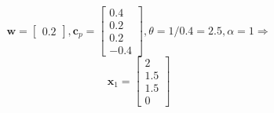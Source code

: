 \documentclass{article}
\begin{document}
\begin{enumerate}
\begin{displaymath}
				\mathbf{w} = \left[ \begin{array}{c} 0.2 \end{array} \right], \mathbf{c}_p = \left[ \begin{array}{r} 0.4 \\ 0.2 \\ 0.2 \\ -0.4 \end{array} \right], \theta = 1/0.4 = 2.5, \alpha = 1 \Rightarrow
			\end{displaymath}
			\begin{displaymath}
				\mathbf{x}_1 = \left[ \begin{array}{c} 2 \\ 1.5 \\ 1.5 \\ 0 \end{array} \right]
			\end{displaymath}
\end{enumerate}
\end{document}
